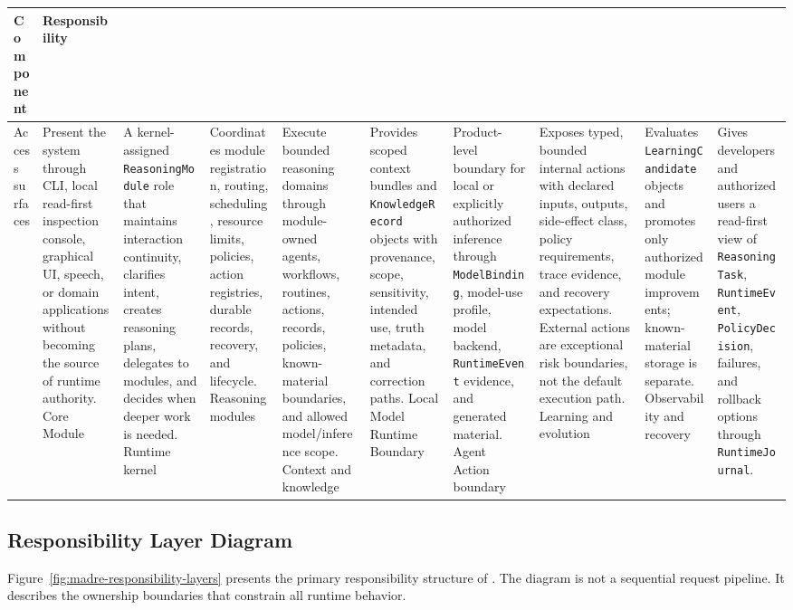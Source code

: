 \begin{tabularx}{.95\linewidth}{@{}lX@{}}
	\toprule
	\textbf{Component} & \textbf{Responsibility} \\
	\midrule
	Access surfaces & Present the system through CLI, local read-first inspection console, graphical UI, speech, or domain applications without becoming the source of runtime authority. \n
	Core Module & A kernel-assigned \texttt{ReasoningModule} role that maintains interaction continuity, clarifies intent, creates reasoning plans, delegates to modules, and decides when deeper work is needed. \n
	Runtime kernel & Coordinates module registration, routing, scheduling, resource limits, policies, action registries, durable records, recovery, and lifecycle. \n
	Reasoning modules & Execute bounded reasoning domains through module-owned agents, workflows, routines, actions, records, policies, known-material boundaries, and allowed model/inference scope. \n
	Context and knowledge & Provides scoped context bundles and \texttt{KnowledgeRecord} objects with provenance, scope, sensitivity, intended use, truth metadata, and correction paths. \n
	Local Model Runtime Boundary & Product-level boundary for local or explicitly authorized inference through \texttt{ModelBinding}, model-use profile, model backend, \texttt{RuntimeEvent} evidence, and generated material. \n
	Agent Action boundary & Exposes typed, bounded internal actions with declared inputs, outputs, side-effect class, policy requirements, trace evidence, and recovery expectations. External actions are exceptional risk boundaries, not the default execution path. \n
	Learning and evolution & Evaluates \texttt{LearningCandidate} objects and promotes only authorized module improvements; known-material storage is separate. \n
	Observability and recovery & Gives developers and authorized users a read-first view of \texttt{ReasoningTask}, \texttt{RuntimeEvent}, \texttt{PolicyDecision}, failures, and rollback options through \texttt{RuntimeJournal}. \\
	\bottomrule
\end{tabularx}
\subsection{Responsibility Layer Diagram}

Figure~\ref{fig:madre-responsibility-layers} presents the primary responsibility structure of \Madre. The diagram is not a sequential request pipeline. It describes the ownership boundaries that constrain all runtime behavior.

